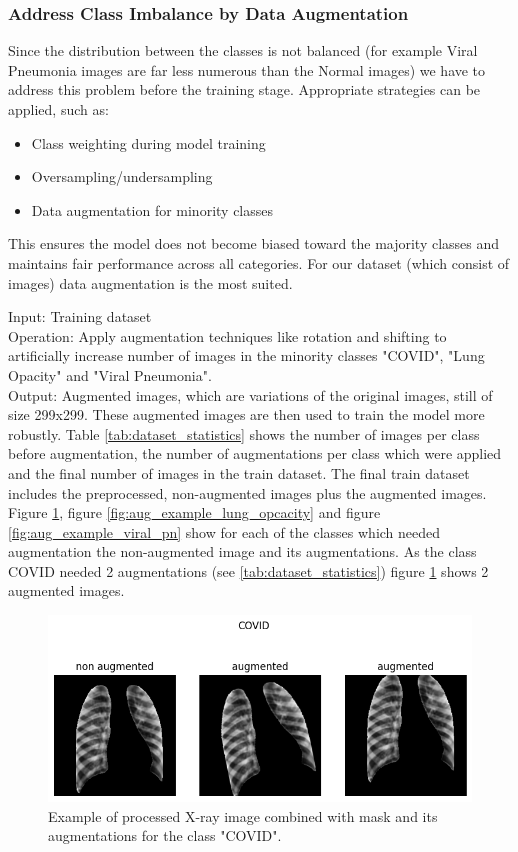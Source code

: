 \documentclass{article}
\begin{document}
\subsubsection{Address Class Imbalance by Data Augmentation} \label{augment}
Since the distribution between the classes is not balanced (for example Viral Pneumonia images are far less numerous than the Normal images) we have to address this problem 
before the training stage. Appropriate strategies can be applied, such as:
\begin{itemize}
    \item Class weighting during model training
    \item Oversampling/undersampling
    \item Data augmentation for minority classes
\end{itemize}
This ensures the model does not become biased toward the majority classes and maintains fair performance across all categories. For our dataset (which consist of images) data augmentation is the most suited.

Input: Training dataset \\%
Operation: Apply augmentation techniques like rotation and shifting to artificially increase number of images in the minority classes "COVID", "Lung Opacity" and 
"Viral Pneumonia".\\
Output: Augmented images, which are variations of the original images, still of size 299x299. These augmented images are then used to train the model more robustly. 
Table \ref{tab:dataset_statistics} shows the number of images per class before augmentation, the number of augmentations per class which were applied and the
final number of images in the train dataset. The final train dataset includes the preprocessed, non-augmented images plus the augmented images.\\
Figure \ref{fig:aug_example_covid}, figure \ref{fig:aug_example_lung_opcacity} and figure \ref{fig:aug_example_viral_pn} show for each of the classes which needed 
augmentation the non-augmented image and its augmentations. As the class COVID needed 2 augmentations (see \ref{tab:dataset_statistics}) figure \ref{fig:aug_example_covid} 
shows 2 augmented images. 


\begin{figure}[!htb] %
    \centering
    \includegraphics[width=1.0\linewidth]{aug_example_covid.png}
    \caption{Example of processed X-ray image combined with mask and its augmentations for the class "COVID".}
    \label{fig:aug_example_covid}
\end{figure}
\end{document}
